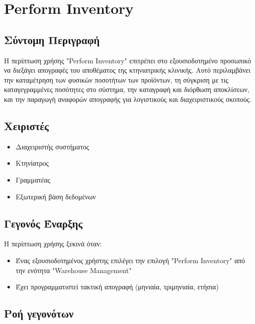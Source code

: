 \documentclass[12pt,a4paper,twoside]{book}
\begin{document}
\section{Perform Inventory}

\subsection{Σύντομη Περιγραφή}
Η περίπτωση χρήσης "Perform Inventory" επιτρέπει στο εξουσιοδοτημένο προσωπικό να διεξάγει απογραφές του αποθέματος της κτηνιατρικής κλινικής. Αυτό περιλαμβάνει την καταμέτρηση των φυσικών ποσοτήτων των προϊόντων, τη σύγκριση με τις καταγεγραμμένες ποσότητες στο σύστημα, την καταγραφή και διόρθωση αποκλίσεων, και την παραγωγή αναφορών απογραφής για λογιστικούς και διαχειριστικούς σκοπούς. %

\subsection{Χειριστές}
\begin{itemize}
  \item Διαχειριστής συστήματος
  \item Κτηνίατρος
  \item Γραμματέας
  \item Εξωτερική βάση δεδομένων %
\end{itemize}

\subsection{Γεγονός Έναρξης}
Η περίπτωση χρήσης ξεκινά όταν:
\begin{itemize}
  \item Ένας εξουσιοδοτημένος χρήστης επιλέγει την επιλογή "Perform Inventory" από την ενότητα "Warehouse Management" %
  \item Έχει προγραμματιστεί τακτική απογραφή (μηνιαία, τριμηνιαία, ετήσια)
\end{itemize}

\subsection{Ροή γεγονότων}
\end{document}
